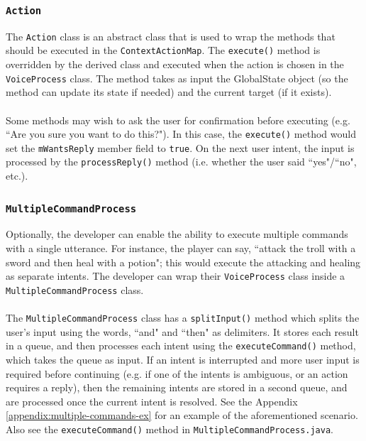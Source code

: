 \documentclass[11pt]{article}
\begin{document}
\subsubsection{\texttt{Action}}
\label{section:action}

The \texttt{Action} class is an abstract class that is used to wrap the methods that should be executed in the \texttt{ContextActionMap}. The \texttt{execute()} method is overridden by the derived class and executed when the action is chosen in the \texttt{VoiceProcess} class. The method takes as input the GlobalState object (so the method can update its state if needed) and the current target (if it exists).
\\
\\
Some methods may wish to ask the user for confirmation before executing (e.g. ``Are you sure you want to do this?"). In this case, the \texttt{execute()} method would set the \texttt{mWantsReply} member field to \texttt{true}. On the next user intent, the input is processed by the \texttt{processReply()} method (i.e. whether the user said ``yes"/``no", etc.).

\subsubsection{\texttt{MultipleCommandProcess}}

Optionally, the developer can enable the ability to execute multiple commands with a single utterance. For instance, the player can say, ``attack the troll with a sword and then heal with a potion"; this would execute the attacking and healing as separate intents. The developer can wrap their \texttt{VoiceProcess} class inside a \texttt{MultipleCommandProcess} class.
\\
\\
The \texttt{MultipleCommandProcess} class has a \texttt{splitInput()} method which splits the user's input using the words, ``and" and ``then" as delimiters. It stores each result in a queue, and then processes each intent using the \texttt{executeCommand()} method, which takes the queue as input. If an intent is interrupted and more user input is required before continuing (e.g. if one of the intents is ambiguous, or an action requires a reply), then the remaining intents are stored in a second queue, and are processed once the current intent is resolved. See the Appendix \ref{appendix:multiple-commands-ex} for an example of the aforementioned scenario. Also see the \texttt{executeCommand()} method in \texttt{MultipleCommandProcess.java}.
\end{document}
